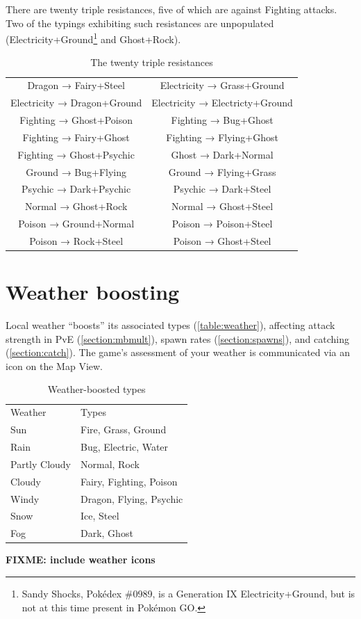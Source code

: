 There are twenty triple resistances, five of which are against Fighting attacks.
Two of the typings exhibiting such resistances are unpopulated
  (Electricity+Ground\footnote{Sandy Shocks, Pokédex \#0989, is a Generation IX
  Electricity+Ground, but is not at this time present in Pokémon GO.} and Ghost+Rock).
\begin{table}[h]
  \begin{center}
    \begin{tabular}{cc}
Dragon → Fairy+Steel & Electricity → Grass+Ground \\
Electricity → Dragon+Ground & Electricity → Electricty+Ground \\
Fighting → Ghost+Poison & Fighting → Bug+Ghost \\
Fighting → Fairy+Ghost & Fighting → Flying+Ghost \\
Fighting → Ghost+Psychic & Ghost → Dark+Normal \\
Ground → Bug+Flying & Ground → Flying+Grass \\
Psychic → Dark+Psychic & Psychic → Dark+Steel \\
Normal → Ghost+Rock & Normal → Ghost+Steel \\
Poison → Ground+Normal & Poison → Poison+Steel \\
Poison → Rock+Steel & Poison → Ghost+Steel \\
    \end{tabular}
    \caption{The twenty triple resistances}
  \end{center}
\end{table}

\section{Weather boosting}
\label{section:weather}
Local weather ``boosts'' its associated types (\autoref{table:weather}), affecting attack strength
 in PvE (\autoref{section:mbmult}),
 spawn rates (\autoref{section:spawns}), and catching (\autoref{section:catch}).
The game's assessment of your weather is communicated via an icon on the Map View.
\begin{table}[ht]
\begin{center}
  \begin{tabular}{ll}
    Weather & Types \\
    \Midrule
    Sun & Fire, Grass, Ground \\
    Rain & Bug, Electric, Water \\
    Partly Cloudy & Normal, Rock \\
    Cloudy & Fairy, Fighting, Poison \\
    Windy & Dragon, Flying, Psychic \\
    Snow & Ice, Steel \\
    Fog & Dark, Ghost \\
  \end{tabular}
  \caption{Weather-boosted types}
  \label{table:weather}
\end{center}
\end{table}
\textbf{FIXME: include weather icons}
